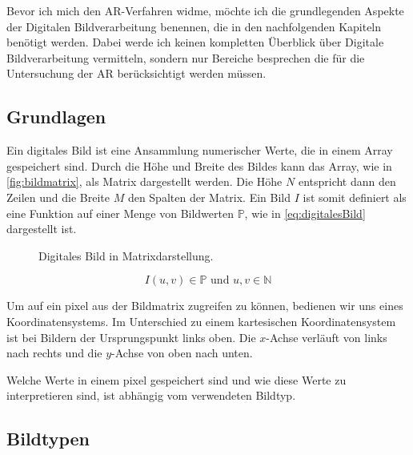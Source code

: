 Bevor ich mich den \gls{AR}-Verfahren widme, möchte ich die grundlegenden Aspekte der Digitalen Bildverarbeitung benennen, die in den nachfolgenden Kapiteln benötigt werden. Dabei werde ich keinen kompletten Überblick über Digitale Bildverarbeitung vermitteln, sondern nur Bereiche besprechen die für die Untersuchung der \gls{AR} berücksichtigt werden müssen.


\subsection{Grundlagen} %
\label{sub:grundlagen}

Ein digitales Bild ist eine Ansammlung numerischer Werte, die in einem Array gespeichert sind. Durch die Höhe und Breite des Bildes kann das Array, wie in \autoref{fig:bildmatrix}, als Matrix dargestellt werden. Die Höhe $N$ entspricht dann den Zeilen und die Breite $M$ den Spalten der Matrix. Ein Bild $I$ ist somit definiert als eine Funktion auf einer Menge von Bildwerten $\mathbb{P}$, wie in \autoref{eq:digitalesBild} dargestellt ist.

\begin{figure}
	\centering
	
	\caption{Digitales Bild in Matrixdarstellung.}
	\label{fig:bildmatrix}
\end{figure}

\begin{equation}
	I\left(u,v\right)\in\mathbb{P} \text{ und } u,v\in\mathbb{N}
	\label{eq:digitalesBild}
\end{equation}

Um auf ein \gls{pixel} aus der Bildmatrix zugreifen zu können, bedienen wir uns eines Koordinatensystems. Im Unterschied zu einem kartesischen Koordinatensystem ist bei Bildern der Ursprungspunkt links oben. Die \(x\)-Achse verläuft von links nach rechts und die \(y\)-Achse von oben nach unten. \begin{comment}\\TODO:vgl abbildung\end{comment} Welche Werte in einem \gls{pixel} gespeichert sind und wie diese Werte zu interpretieren sind, ist abhängig vom verwendeten Bildtyp.


\subsection{Bildtypen} %
\label{sub:bildtypen}

